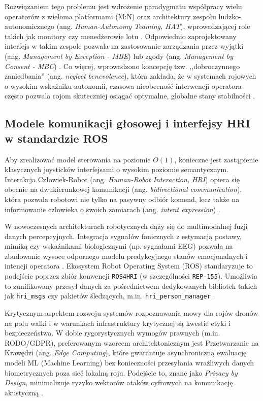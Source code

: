 Rozwiązaniem tego problemu jest wdrożenie paradygmatu współpracy wielu operatorów z wieloma platformami (M:N) oraz architektury zespołu ludzko-autonomicznego (ang. \textit{Human-Autonomy Teaming, HAT}), wprowadzającej role takich jak monitory czy menedżerowie lotu \cite{smith2021}. Odpowiednio zaprojektowany interfejs w takim zespole pozwala na zastosowanie zarządzania przez wyjątki (ang. \textit{Management by Exception - MBE}) lub zgody (ang. \textit{Management by Consent - MBC}) \cite{chen2010}. Co więcej, wprowadzono koncepcję tzw. ,,dobroczynnego zaniedbania'' (ang. \textit{neglect benevolence}), która zakłada, że w systemach rojowych o wysokim wskaźniku autonomii, czasowa nieobecność interwencji operatora często pozwala rojom skuteczniej osiągać optymalne, globalne stany stabilności \cite{kolling2016}.

\subsection{Modele komunikacji głosowej i interfejsy HRI w standardzie ROS}
Aby zrealizować model sterowania na poziomie $O(1)$, konieczne jest zastąpienie klasycznych joysticków interfejsami o wysokim poziomie semantycznym. Interakcja Człowiek-Robot (ang. \textit{Human-Robot Interaction, HRI}) opiera się obecnie na dwukierunkowej komunikacji (ang. \textit{bidirectional communication}), która pozwala robotowi nie tylko na pasywny odbiór komend, lecz także na informowanie człowieka o swoich zamiarach (ang. \textit{intent expression}) \cite{pomianek2026}.

W nowoczesnych architekturach robotycznych dąży się do multimodalnej fuzji danych percepcyjnych. Integracja sygnałów fonicznych z estymacją postawy, mimiką czy wskaźnikami biologicznymi (np. sygnałami EEG) pozwala na zbudowanie wysoce odpornego modelu predykcyjnego stanów emocjonalnych i intencji operatora \cite{pomianek2026}. Ekosystem Robot Operating System (ROS) standaryzuje to podejście poprzez zbiór konwencji \texttt{ROS4HRI} (w szczególności \texttt{REP-155}). Umożliwia to zunifikowany przesył danych za pośrednictwem dedykowanych bibliotek takich jak \texttt{hri\_msgs} czy pakietów śledzących, m.in. \texttt{hri\_person\_manager} \cite{pomianek2026}. 

Krytycznym aspektem rozwoju systemów rozpoznawania mowy dla rojów dronów na polu walki i w warunkach infrastruktury krytycznej są kwestie etyki i bezpieczeństwa. W dobie rygorystycznych wymogów prawnych (m.in. RODO/GDPR), preferowanym wzorcem architektonicznym jest Przetwarzanie na Krawędzi (ang. \textit{Edge Computing}), które gwarantuje asynchroniczną ewaluację modeli ML (Machine Learning) bez konieczności przesyłania wrażliwych danych biometrycznych poza sieć lokalną roju. Podejście to, znane jako \textit{Privacy by Design}, minimalizuje ryzyko wektorów ataków cyfrowych na komunikację akustyczną \cite{pomianek2026}.

